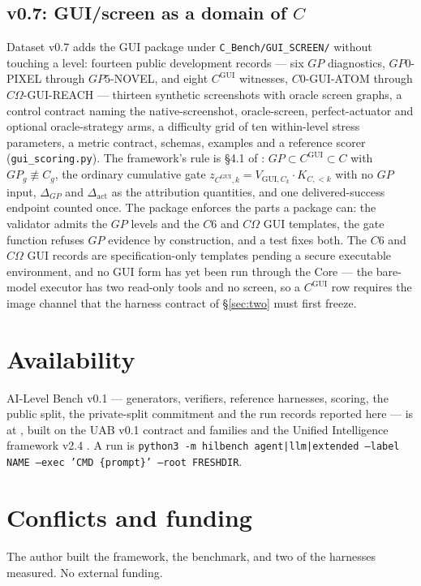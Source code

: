 \subsection{v0.7: GUI/screen as a domain of \texorpdfstring{$C$}{C}}\label{sec:gui}

Dataset v0.7 adds the GUI package under \texttt{C\_Bench/GUI\_SCREEN/} without touching a level: fourteen public development records --- six $GP$ diagnostics, $GP0$-PIXEL through $GP5$-NOVEL, and eight $C^{\mathrm{GUI}}$ witnesses, $C0$-GUI-ATOM through $C\Omega$-GUI-REACH --- thirteen synthetic screenshots with oracle screen graphs, a control contract naming the native-screenshot, oracle-screen, perfect-actuator and optional oracle-strategy arms, a difficulty grid of ten within-level stress parameters, a metric contract, schemas, examples and a reference scorer (\texttt{gui\_scoring.py}). The framework's rule is \S4.1 of \citet{yang2026unified}: $GP \subset C^{\mathrm{GUI}} \subset C$ with $GP_g \not\equiv C_g$, the ordinary cumulative gate $z_{C^{\mathrm{GUI}},k} = V_{\mathrm{GUI},C_k}\cdot K_{C,<k}$ with no $GP$ input, $\Delta_{GP}$ and $\Delta_{\mathrm{act}}$ as the attribution quantities, and one delivered-success endpoint counted once. The package enforces the parts a package can: the validator admits the $GP$ levels and the $C6$ and $C\Omega$ GUI templates, the gate function refuses $GP$ evidence by construction, and a test fixes both. The $C6$ and $C\Omega$ GUI records are specification-only templates pending a secure executable environment, and no GUI form has yet been run through the Core --- the bare-model executor has two read-only tools and no screen, so a $C^{\mathrm{GUI}}$ row requires the image channel that the harness contract of \S\ref{sec:two} must first freeze.


\section*{Availability}

AI-Level Bench v0.1 --- generators, verifiers, reference harnesses, scoring, the public split, the private-split commitment and the run records reported here --- is at \citet{yang2026hilbench}, built on the UAB v0.1 contract and families \citep{yang2026uab} and the Unified Intelligence framework v2.4 \citep{yang2026unified}. A run is \texttt{python3 -m hilbench agent|llm|extended --label NAME --exec 'CMD \{prompt\}' --root FRESHDIR}.

\section*{Conflicts and funding}

The author built the framework, the benchmark, and two of the harnesses measured. No external funding.
